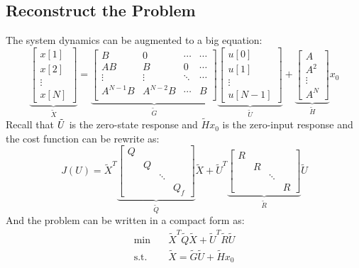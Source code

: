 \documentclass[10pt,a4paper,oneside]{article}
\begin{document}
\subsection{Reconstruct the Problem}
The system dynamics  can be augmented to a big equation:
$$
\underbrace{\left[\begin{array}{c}{x[1]} \\ {x[2]} \\ {\vdots} \\{x[N]}\end{array}\right]}_{\tilde{X}}
=
\underbrace{\left[\begin{array}{cccc}
	{B} & {0} & {\cdots} & {\cdots} \\ 
	{A B} & {B} & {0} & {\cdots}  \\ 
	{\vdots} & {\vdots} & {\ddots} & {\cdots} \\ 
	{A^{N-1} B} & {A^{N-2} B} & {\cdots} & {B}\\
	\end{array}\right]}_{\tilde{G}}
\underbrace{\left[\begin{array}{c}{u[0]} \\ {u[1]} \\ {\vdots} \\ {u[N-1]}\end{array}\right]}_{\tilde{U}}+
\underbrace{\left[\begin{array}{c}{A} \\ {A^{2}} \\ {\vdots} \\ {A^{N}}\end{array}\right]}_{\tilde{H}} x_{0}
$$
Recall that $\title{G}\tilde{U}$ is the zero-state response and $\tilde{H}x_0$ is the zero-input response and the cost function can be rewrite as:
\[
J(U) = 
\tilde{X}^T\underbrace{\left[\begin{array}{cccc}
	{Q} & {} & {} & {} \\ 
	{} & {Q} & {} & {} \\ 
	{} & {} & {\ddots} & {} \\ 
	{} & {} & {} & {Q_f}\end{array}\right]}_{\tilde{Q}} \tilde{X}+
\tilde{U}^T\underbrace{\left[\begin{array}{cccc}
	{R} & {} & {} & {} \\ 
	{} & {R} & {} & {} \\ 
	{} & {} & {\ddots} & {} \\
	 {} & {} & {} & {R}\end{array}\right]}_{\tilde{R}}\tilde{U}
\]
And the problem can be written in a compact form as:
\begin{align*}
\min \quad &\tilde{X}^T \tilde{Q} \tilde{X} + \tilde{U}^T \tilde{R} \tilde{U}\\
\text{s.t.} \quad &\tilde{X} = \tilde{G} \tilde{U} + \tilde{H}x_0
\end{align*}
\end{document}
